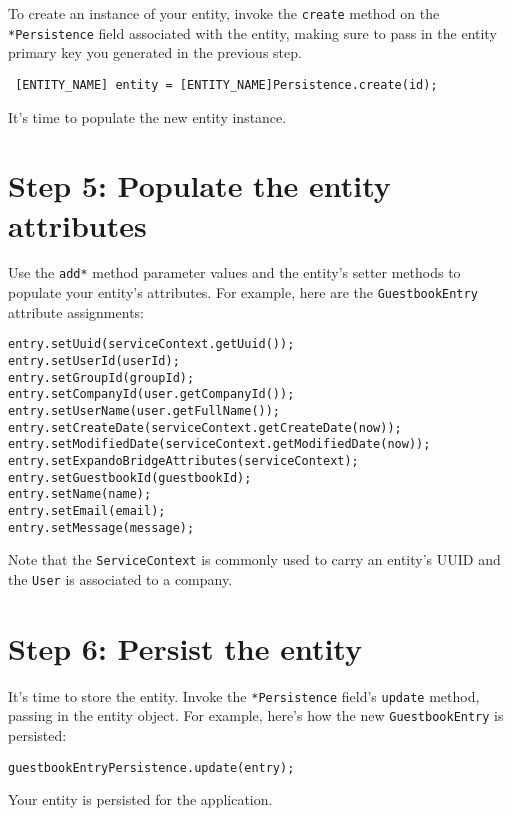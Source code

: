 To create an instance of your entity, invoke the \texttt{create} method
on the \texttt{*Persistence} field associated with the entity, making
sure to pass in the entity primary key you generated in the previous
step.

\begin{verbatim}
 [ENTITY_NAME] entity = [ENTITY_NAME]Persistence.create(id);
\end{verbatim}

It's time to populate the new entity instance.

\section{Step 5: Populate the entity
attributes}\label{step-5-populate-the-entity-attributes}

Use the \texttt{add*} method parameter values and the entity's setter
methods to populate your entity's attributes. For example, here are the
\texttt{GuestbookEntry} attribute assignments:

\begin{verbatim}
entry.setUuid(serviceContext.getUuid());
entry.setUserId(userId);
entry.setGroupId(groupId);
entry.setCompanyId(user.getCompanyId());
entry.setUserName(user.getFullName());
entry.setCreateDate(serviceContext.getCreateDate(now));
entry.setModifiedDate(serviceContext.getModifiedDate(now));
entry.setExpandoBridgeAttributes(serviceContext);
entry.setGuestbookId(guestbookId);
entry.setName(name);
entry.setEmail(email);
entry.setMessage(message);
\end{verbatim}

Note that the \texttt{ServiceContext} is commonly used to carry an
entity's UUID and the \texttt{User} is associated to a company.

\section{Step 6: Persist the entity}\label{step-6-persist-the-entity}

It's time to store the entity. Invoke the \texttt{*Persistence} field's
\texttt{update} method, passing in the entity object. For example,
here's how the new \texttt{GuestbookEntry} is persisted:

\begin{verbatim}
guestbookEntryPersistence.update(entry);
\end{verbatim}

Your entity is persisted for the application.

